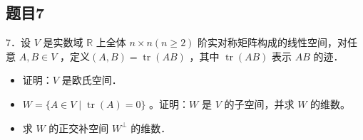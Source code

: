 \documentclass{article}
\begin{document}
\subsection{题目7}
7．设 \(V\) 是实数域 \(\mathbb{R}\) 上全体 \(n \times n(n \geq 2)\) 阶实对称矩阵构成的线性空间，对任意 \(A, B \in V\) ，定义\((A, B)=\operatorname{tr}(A B)\) ，其中 \(\operatorname{tr}(A B)\) 表示 \(A B\) 的迹．

\begin{itemize}
  \item[（1）] 证明：\(V\) 是欧氏空间．
  \item[（2）] \(W=\{A \in V \mid \operatorname{tr}(A)=0\}\) 。证明：\(W\) 是 \(V\) 的子空间，并求 \(W\) 的维数。
  \item[（3）] 求 \(W\) 的正交补空间 \(W^{\perp}\) 的维数．
\end{itemize}
\end{document}
